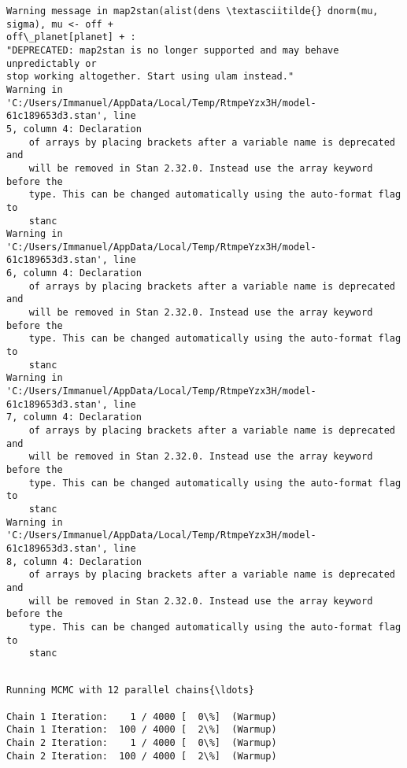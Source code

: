 \documentclass[11pt]{article}
\begin{document}
    \begin{Verbatim}[commandchars=\\\{\}]
Warning message in map2stan(alist(dens \textasciitilde{} dnorm(mu, sigma), mu <- off +
off\_planet[planet] + :
"DEPRECATED: map2stan is no longer supported and may behave unpredictably or
stop working altogether. Start using ulam instead."
Warning in
'C:/Users/Immanuel/AppData/Local/Temp/RtmpeYzx3H/model-61c189653d3.stan', line
5, column 4: Declaration
    of arrays by placing brackets after a variable name is deprecated and
    will be removed in Stan 2.32.0. Instead use the array keyword before the
    type. This can be changed automatically using the auto-format flag to
    stanc
Warning in
'C:/Users/Immanuel/AppData/Local/Temp/RtmpeYzx3H/model-61c189653d3.stan', line
6, column 4: Declaration
    of arrays by placing brackets after a variable name is deprecated and
    will be removed in Stan 2.32.0. Instead use the array keyword before the
    type. This can be changed automatically using the auto-format flag to
    stanc
Warning in
'C:/Users/Immanuel/AppData/Local/Temp/RtmpeYzx3H/model-61c189653d3.stan', line
7, column 4: Declaration
    of arrays by placing brackets after a variable name is deprecated and
    will be removed in Stan 2.32.0. Instead use the array keyword before the
    type. This can be changed automatically using the auto-format flag to
    stanc
Warning in
'C:/Users/Immanuel/AppData/Local/Temp/RtmpeYzx3H/model-61c189653d3.stan', line
8, column 4: Declaration
    of arrays by placing brackets after a variable name is deprecated and
    will be removed in Stan 2.32.0. Instead use the array keyword before the
    type. This can be changed automatically using the auto-format flag to
    stanc


    \end{Verbatim}

    \begin{Verbatim}[commandchars=\\\{\}]
Running MCMC with 12 parallel chains{\ldots}

Chain 1 Iteration:    1 / 4000 [  0\%]  (Warmup)
Chain 1 Iteration:  100 / 4000 [  2\%]  (Warmup)
Chain 2 Iteration:    1 / 4000 [  0\%]  (Warmup)
Chain 2 Iteration:  100 / 4000 [  2\%]  (Warmup)
    \end{Verbatim}
\end{document}
